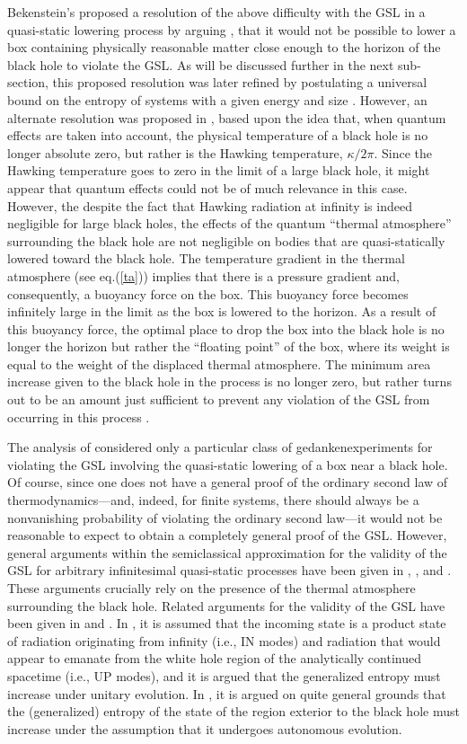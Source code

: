 Bekenstein's proposed a resolution of the above difficulty with the
GSL in a quasi-static lowering process by arguing \cite{b1}, \cite{b2}
that it would not be possible to lower a box containing physically
reasonable matter close enough to the horizon of the black hole to
violate the GSL. As will be discussed further in the next sub-section,
this proposed resolution was later refined by postulating a universal
bound on the entropy of systems with a given energy and size
\cite{b3}. However, an alternate resolution was proposed in \cite{uw},
based upon the idea that, when quantum effects are taken into account,
the physical temperature of a black hole is no longer absolute zero,
but rather is the Hawking temperature, $\kappa/2\pi$. Since the
Hawking temperature goes to zero in the limit of a large black hole,
it might appear that quantum effects could not be of much relevance in
this case. However, the despite the fact that Hawking radiation at
infinity is indeed negligible for large black holes, the effects of
the quantum ``thermal atmosphere'' surrounding the black hole are not
negligible on bodies that are quasi-statically lowered toward the
black hole.  The temperature gradient in the thermal atmosphere (see
eq.(\ref{ta})) implies that there is a pressure gradient and,
consequently, a buoyancy force on the box. This buoyancy force becomes
infinitely large in the limit as the box is lowered to the horizon.
As a result of this buoyancy force, the optimal place to drop the box
into the black hole is no longer the horizon but rather the ``floating
point'' of the box, where its weight is equal to the weight of the
displaced thermal atmosphere. The minimum area increase given to the
black hole in the process is no longer zero, but rather turns out
to be an amount just sufficient to prevent any violation of the GSL
from occurring in this process \cite{uw}.

The analysis of \cite{uw} considered only a particular class of
gedankenexperiments for violating the GSL involving the quasi-static
lowering of a box near a black hole. Of course, since one does not
have a general proof of the ordinary second law of
thermodynamics---and, indeed, for finite systems, there should always
be a nonvanishing probability of violating the ordinary second
law---it would not be reasonable to expect to obtain a completely
general proof of the GSL. However, general arguments within the
semiclassical approximation for the validity of the GSL for arbitrary
infinitesimal quasi-static processes have been given in \cite{tz},
\cite{tzp}, and \cite{w4}. These arguments crucially rely on the
presence of the thermal atmosphere surrounding the black hole.
Related arguments for the validity of the GSL have been given in
\cite{fp} and \cite{s}. In \cite{fp}, it is assumed that the incoming
state is a product state of radiation originating from infinity (i.e.,
IN modes) and radiation that would appear to emanate from the white
hole region of the analytically continued spacetime (i.e., UP modes),
and it is argued that the generalized entropy must increase under
unitary evolution. In \cite{s}, it is argued on quite general grounds
that the (generalized) entropy of the state of the region exterior to
the black hole must increase under the assumption that it undergoes
autonomous evolution.


